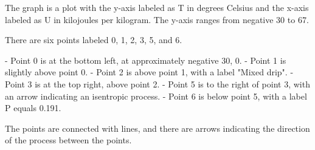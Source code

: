 The graph is a plot with the y-axis labeled as T in degrees Celsius and the x-axis labeled as U in kilojoules per kilogram. The y-axis ranges from negative 30 to 67.

There are six points labeled 0, 1, 2, 3, 5, and 6.

- Point 0 is at the bottom left, at approximately negative 30, 0.
- Point 1 is slightly above point 0.
- Point 2 is above point 1, with a label "Mixed drip".
- Point 3 is at the top right, above point 2.
- Point 5 is to the right of point 3, with an arrow indicating an isentropic process.
- Point 6 is below point 5, with a label P equals 0.191.

The points are connected with lines, and there are arrows indicating the direction of the process between the points.